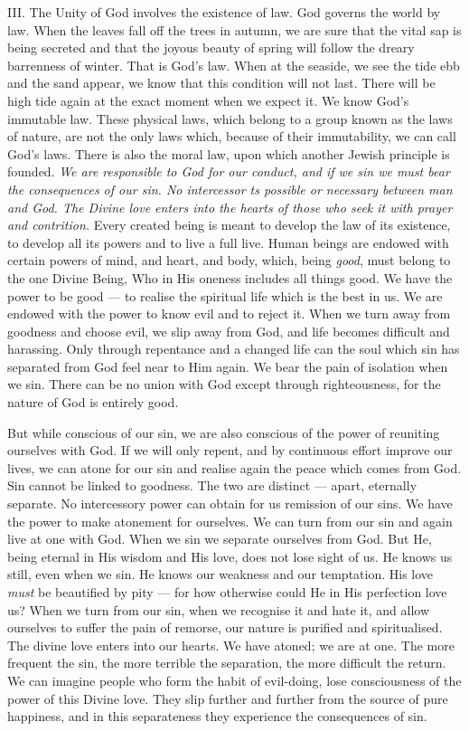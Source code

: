 \label{responsibility}
III. The Unity of God involves the existence of law. God governs the world by
law. When the leaves fall off the trees in
autumn, we are sure that the vital sap is
being secreted and that the joyous beauty of
spring will follow the dreary barrenness of
winter. That is God’s law. When at the
seaside, we see the tide ebb and the sand
appear, we know that this condition will not
last. There will be high tide again at the
exact moment when we expect it. We know
God’s immutable law. These physical laws,
which belong to a group known as the laws
of nature, are not the only laws which, because
of their immutability, we can call God’s laws.
There is also the moral law, upon which
another Jewish principle is founded. 
\textsl{We are responsible to God for our conduct, and if
we sin we must bear the consequences of our
sin. No intercessor ts possible or necessary
between man and God. The Divine love
enters into the hearts of those who seek it
with prayer and contrition.} Every created
being is meant to develop the law of its
existence, to develop all its powers and to
live a full live. Human beings are endowed
with certain powers of mind, and heart, and
body, which, being \textsl{good}, must belong to the
one Divine Being, Who in His oneness
includes all things good. We have the
power to be good — to realise the spiritual
life which is the best in us. We are endowed
with the power to know evil and to reject it.
When we turn away from goodness and
choose evil, we slip away from God, and life
becomes difficult and harassing. Only
through repentance and a changed life can
the soul which sin has separated from God
feel near to Him again. We bear the pain
of isolation when we sin. There can be no
union with God except through righteousness,
for the nature of God is entirely good.
\label{evil}

But while conscious of our sin, we are also
conscious of the power of reuniting ourselves
with God. If we will only repent, and by
continuous effort improve our lives, we can
atone for our sin and realise again the peace
which comes from God. Sin cannot be linked
to goodness. The two are distinct — apart,
eternally separate. No intercessory power
can obtain for us remission of our sins. We
have the power to make atonement for ourselves.
We can turn from our sin and again
live at one with God. When we sin we
separate ourselves from God. But He, being
eternal in His wisdom and His love, does
not lose sight of us. He knows us still, even
when we sin. He knows our weakness and
our temptation. His love \textsl{must} be beautified
by pity — for how otherwise could He in His
perfection love us? When we turn from our
sin, when we recognise it and hate it, and
allow ourselves to suffer the pain of remorse,
our nature is purified and spiritualised. The
divine love enters into our hearts. We have
atoned; we are at one. The more frequent
the sin, the more terrible the separation, the
more difficult the return. We can imagine
people who form the habit of evil-doing, lose
consciousness of the power of this Divine love.
They slip further and further from the source
of pure happiness, and in this separateness
they experience the consequences of sin.

